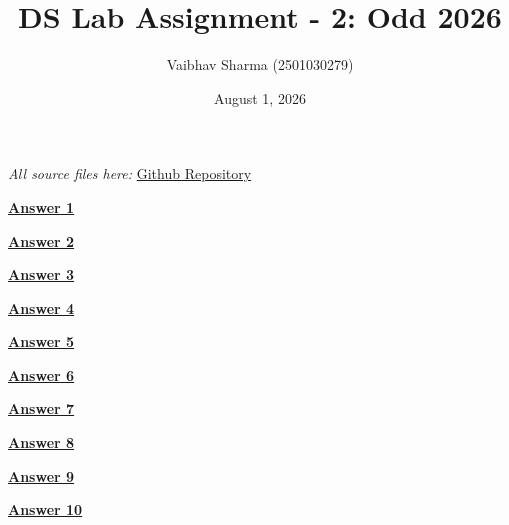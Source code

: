 \documentclass[a4paper, 12pt]{article}
\title{\textbf{DS Lab Assignment - 2: Odd 2026}}
\author{Vaibhav Sharma (2501030279)}
\date{August 1, 2026}
\begin{document}
\maketitle

\noindent \textit{All source files here: } \href{https://github.com/Tartuf-57/JIIT-CSE/tree/main/2nd-year/DS/Lab_Assignments/Week_2}{Github Repository}

\bigskip
\bigskip

\noindent\textbf{\large\underline{Answer 1}}
\bigskip
\bigskip



\bigskip

\noindent\textbf{\large\underline{Answer 2}}
\bigskip
\bigskip




\bigskip
\bigskip
\bigskip

\noindent\textbf{\large\underline{Answer 3}}
\bigskip
\bigskip



\newpage
\noindent\textbf{\large\underline{Answer 4}}
\bigskip
\bigskip




\bigskip
\noindent\textbf{\large\underline{Answer 5}}
\bigskip
\bigskip




\bigskip
\bigskip\bigskip
\bigskip

\noindent\textbf{\large\underline{Answer 6}}
\bigskip
\bigskip




\bigskip
\bigskip\bigskip
\bigskip
\noindent\textbf{\large\underline{Answer 7}}
\bigskip
\bigskip



\bigskip
\bigskip\bigskip
\bigskip
\noindent\textbf{\large\underline{Answer 8}}
\bigskip
\bigskip


\bigskip
\bigskip
\noindent\textbf{\large\underline{Answer 9}}
\bigskip
\bigskip


\bigskip
\bigskip
\noindent\textbf{\large\underline{Answer 10}}
\bigskip
\bigskip

\end{document}
